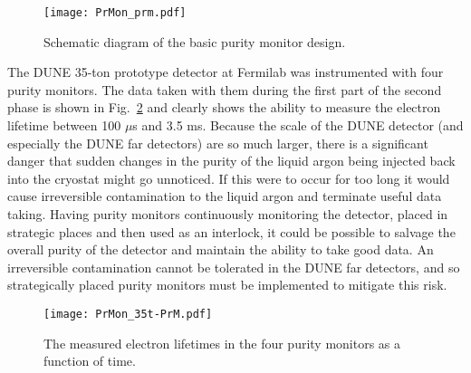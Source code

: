 \begin{figure}[h]
\centering
\texttt{[image: PrMon\_prm.pdf]}
\caption{Schematic diagram of the basic purity monitor design.}\label{fig:prm}
\end{figure}

The DUNE 35-ton prototype detector at Fermilab was instrumented with four purity monitors. The data taken with them during the first part of the second phase is shown in Fig.~\ref{fig-35t-prm} and clearly shows the ability to measure the electron lifetime between 100 $\mu$s and 3.5 ms.  Because the scale of the DUNE detector (and especially the DUNE far detectors) are so much larger, there is a significant danger that sudden changes in the purity of the liquid argon being injected back into the cryostat might go unnoticed. If this were to occur for too long it would cause irreversible contamination to the liquid argon and terminate useful data taking.  Having purity monitors continuously monitoring the detector, placed in strategic places and then used as an interlock, it could be possible to salvage the overall purity of the detector and maintain the ability to take good data. An irreversible contamination cannot be tolerated in the DUNE far detectors, and so strategically placed purity monitors must be implemented to mitigate this risk. 



\begin{figure}[t!]
\begin{center}
\texttt{[image: PrMon\_35t-PrM.pdf]}
\caption{The measured electron lifetimes in the four purity monitors as a function of time.} \label{fig-35t-prm}
\end{center}
\end{figure}



